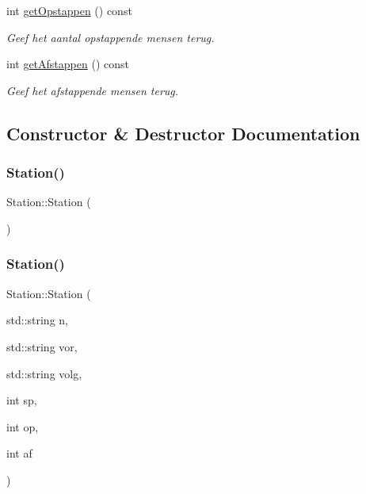 \begin{DoxyCompactItemize}
int \hyperlink{class_station_a5897f83319093d502f01f18b24678aba}{get\+Opstappen} () const
\begin{DoxyCompactList}\small\item\em Geef het aantal opstappende mensen terug. \end{DoxyCompactList}\item 
int \hyperlink{class_station_a36af036851a8e31b7a2be381928dadb5}{get\+Afstappen} () const
\begin{DoxyCompactList}\small\item\em Geef het afstappende mensen terug. \end{DoxyCompactList}\end{DoxyCompactItemize}


\subsection{Constructor \& Destructor Documentation}
\mbox{\label{class_station_a73d335726aad1d844d81cda6d9fd74e6}} 
\subsubsection{\texorpdfstring{Station()}{Station()}\hspace{0.1cm}{\footnotesize\ttfamily [1/2]}}
{\footnotesize\ttfamily Station\+::\+Station (\begin{DoxyParamCaption}{ }\end{DoxyParamCaption})}

\mbox{\label{class_station_a41fd39388109ad33ea86eb9831ab2f45}} 
\subsubsection{\texorpdfstring{Station()}{Station()}\hspace{0.1cm}{\footnotesize\ttfamily [2/2]}}
{\footnotesize\ttfamily Station\+::\+Station (\begin{DoxyParamCaption}\item[{std\+::string}]{n,  }\item[{std\+::string}]{vor,  }\item[{std\+::string}]{volg,  }\item[{int}]{sp,  }\item[{int}]{op,  }\item[{int}]{af }\end{DoxyParamCaption})}



